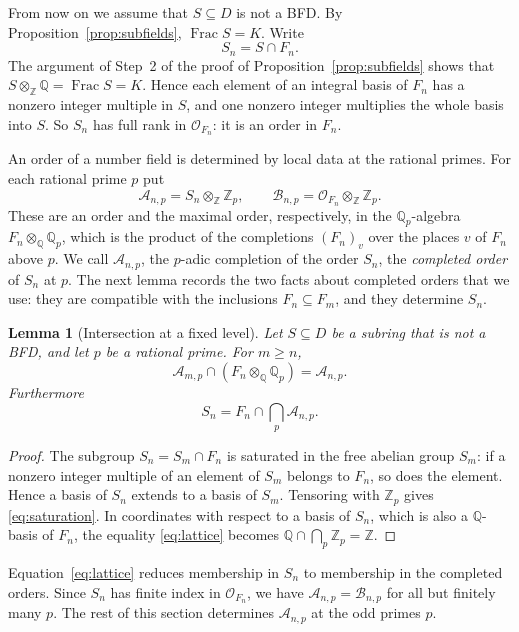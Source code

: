\documentclass[11pt]{article}
\theoremstyle{plain}
\newtheorem{lemma}[theorem]{Lemma}
\theoremstyle{definition}
\theoremstyle{remark}
\DeclareMathOperator{\Frac}{Frac}
\newcommand{\Z}{\mathbb Z}
\newcommand{\Q}{\mathbb Q}
\newcommand{\OO}{\mathcal O}
\begin{document}
From now on we assume that $S\subseteq D$ is not a BFD.  By
Proposition~\ref{prop:subfields}, $\Frac S=K$.  Write
\[
 S_n=S\cap F_n .
\]
The argument of Step~2 of the proof of Proposition~\ref{prop:subfields}
shows that $S\otimes_\Z\Q=\Frac S=K$.  Hence each element of an integral
basis of $F_n$ has a nonzero integer multiple in $S$, and one nonzero
integer multiplies the whole basis into $S$.  So $S_n$ has full rank in
$\OO_{F_n}$: it is an order in $F_n$.

An order of a number field is determined by local data at the rational
primes.  For each rational prime $p$ put
\[
 \mathcal A_{n,p}=S_n\otimes_\Z\Z_p,\qquad
 \mathcal B_{n,p}=\OO_{F_n}\otimes_\Z\Z_p.
\]
These are an order and the maximal order, respectively, in the
$\Q_p$-algebra $F_n\otimes_\Q\Q_p$, which is the product of the
completions $(F_n)_v$ over the places $v$ of $F_n$ above $p$.  We call
$\mathcal A_{n,p}$, the $p$-adic completion of the order $S_n$, the
\emph{completed order} of $S_n$ at $p$.  The next lemma records the two
facts about completed orders that we use: they are compatible with the
inclusions $F_n\subseteq F_m$, and they determine $S_n$.

\begin{lemma}[Intersection at a fixed level]\label{lem:intersection}
Let $S\subseteq D$ be a subring that is not a BFD, and let $p$ be a
rational prime.  For $m\geq n$,
\begin{equation}\label{eq:saturation}
 \mathcal A_{m,p}\cap(F_n\otimes_\Q\Q_p)=\mathcal A_{n,p}.
\end{equation}
Furthermore
\begin{equation}\label{eq:lattice}
 S_n=F_n\cap\bigcap_p\mathcal A_{n,p}.
\end{equation}
\end{lemma}
\begin{proof}
The subgroup $S_n=S_m\cap F_n$ is saturated in the free abelian group
$S_m$: if a nonzero integer multiple of an element of $S_m$ belongs to
$F_n$, so does the element.  Hence a basis of $S_n$ extends to a basis of
$S_m$.  Tensoring with $\Z_p$ gives \eqref{eq:saturation}.  In coordinates
with respect to a basis of $S_n$, which is also a $\Q$-basis of $F_n$,
the equality \eqref{eq:lattice} becomes $\Q\cap\bigcap_p\Z_p=\Z$.
\end{proof}

Equation~\eqref{eq:lattice} reduces membership in $S_n$ to membership in
the completed orders.  Since $S_n$ has finite index in $\OO_{F_n}$, we
have $\mathcal A_{n,p}=\mathcal B_{n,p}$ for all but finitely many $p$.
The rest of this section determines $\mathcal A_{n,p}$ at the odd primes
$p$.
\end{document}
